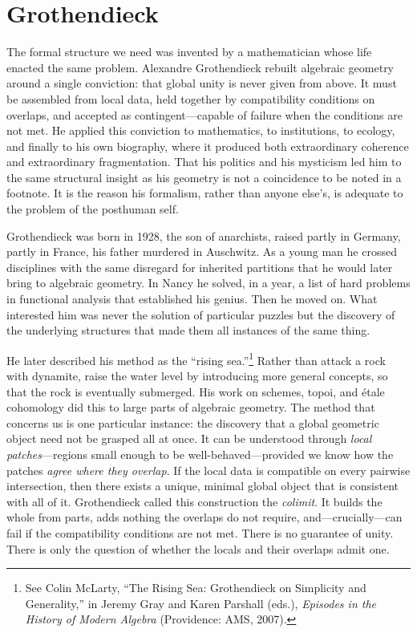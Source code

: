 \section{Grothendieck}

The formal structure we need was invented by a mathematician whose life enacted the same problem. Alexandre Grothendieck rebuilt algebraic geometry around a single conviction: that global unity is never given from above. It must be assembled from local data, held together by compatibility conditions on overlaps, and accepted as contingent---capable of failure when the conditions are not met. He applied this conviction to mathematics, to institutions, to ecology, and finally to his own biography, where it produced both extraordinary coherence and extraordinary fragmentation. That his politics and his mysticism led him to the same structural insight as his geometry is not a coincidence to be noted in a footnote. It is the reason his formalism, rather than anyone else's, is adequate to the problem of the posthuman self.

Grothendieck was born in 1928, the son of anarchists, raised partly in Germany, partly in France, his father murdered in Auschwitz. As a young man he crossed disciplines with the same disregard for inherited partitions that he would later bring to algebraic geometry. In Nancy he solved, in a year, a list of hard problems in functional analysis that established his genius. Then he moved on. What interested him was never the solution of particular puzzles but the discovery of the underlying structures that made them all instances of the same thing.

He later described his method as the ``rising sea.''\footnote{See Colin McLarty, ``The Rising Sea: Grothendieck on Simplicity and Generality,'' in Jeremy Gray and Karen Parshall (eds.), \emph{Episodes in the History of Modern Algebra} (Providence: AMS, 2007).} Rather than attack a rock with dynamite, raise the water level by introducing more general concepts, so that the rock is eventually submerged. His work on schemes, topoi, and \'{e}tale cohomology did this to large parts of algebraic geometry. The method that concerns us is one particular instance: the discovery that a global geometric object need not be grasped all at once. It can be understood through \emph{local patches}---regions small enough to be well-behaved---provided we know how the patches \emph{agree where they overlap}. If the local data is compatible on every pairwise intersection, then there exists a unique, minimal global object that is consistent with all of it. Grothendieck called this construction the \emph{colimit}. It builds the whole from parts, adds nothing the overlaps do not require, and---crucially---can fail if the compatibility conditions are not met. There is no guarantee of unity. There is only the question of whether the locals and their overlaps admit one.

